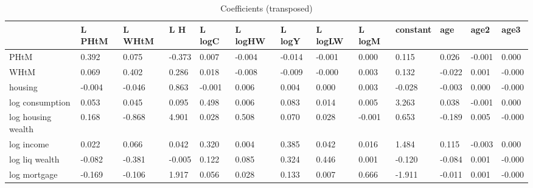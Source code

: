 \begin{table}[htbp]
\caption{\label{clabel} Coefficients (transposed)}\centering\medskip
\begin{tabular}{lllllllllllll} \hline \hline
 & L PHtM  & L WHtM  & L H  & L logC  & L logHW  & L logY  & L logLW  & L logM  & constant  & age  & age2  & age3  \\  \hline 
PHtM &     0.392 &     0.075 &    -0.373 &     0.007 &    -0.004 &    -0.014 &    -0.001 &     0.000 &     0.115 &     0.026 &    -0.001 &     0.000 \\  
WHtM &     0.069 &     0.402 &     0.286 &     0.018 &    -0.008 &    -0.009 &    -0.000 &     0.003 &     0.132 &    -0.022 &     0.001 &    -0.000 \\  
housing &    -0.004 &    -0.046 &     0.863 &    -0.001 &     0.006 &     0.004 &     0.000 &     0.003 &    -0.028 &    -0.003 &     0.000 &    -0.000 \\  
log consumption &     0.053 &     0.045 &     0.095 &     0.498 &     0.006 &     0.083 &     0.014 &     0.005 &     3.263 &     0.038 &    -0.001 &     0.000 \\  
log housing wealth &     0.168 &    -0.868 &     4.901 &     0.028 &     0.508 &     0.070 &     0.028 &    -0.001 &     0.653 &    -0.189 &     0.005 &    -0.000 \\  
log income &     0.022 &     0.066 &     0.042 &     0.320 &     0.004 &     0.385 &     0.042 &     0.016 &     1.484 &     0.115 &    -0.003 &     0.000 \\  
log liq wealth &    -0.082 &    -0.381 &    -0.005 &     0.122 &     0.085 &     0.324 &     0.446 &     0.001 &    -0.120 &    -0.084 &     0.001 &    -0.000 \\  
log mortgage &    -0.169 &    -0.106 &     1.917 &     0.056 &     0.028 &     0.133 &     0.007 &     0.666 &    -1.911 &    -0.011 &     0.001 &    -0.000 \\  
\hline \hline \end{tabular}
\end{table}
